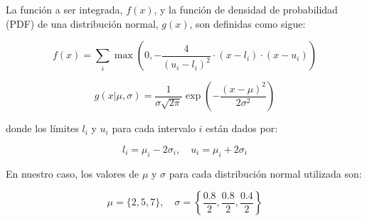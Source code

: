 \documentclass{article}
\begin{document}
La función a ser integrada, \( f(x) \), y la función de densidad de probabilidad (PDF) de una distribución normal, \( g(x) \), son definidas como sigue:

\[
f(x) = \sum_{i} \max\left(0, -\frac{4}{(u_i - l_i)^2} \cdot (x - l_i) \cdot (x - u_i)\right)
\]

\[
g(x | \mu, \sigma) = \frac{1}{\sigma\sqrt{2\pi}} \exp\left(-\frac{(x - \mu)^2}{2\sigma^2}\right)
\]

donde los límites \( l_i \) y \( u_i \) para cada intervalo \( i \) están dados por:

\[
l_i = \mu_i - 2\sigma_i, \quad u_i = \mu_i + 2\sigma_i
\]

En nuestro caso, los valores de \( \mu \) y \( \sigma \) para cada distribución normal utilizada son:

\[
\mu = \{2, 5, 7\}, \quad \sigma = \left\{\frac{0.8}{2}, \frac{0.8}{2}, \frac{0.4}{2}\right\}
\]
\end{document}
